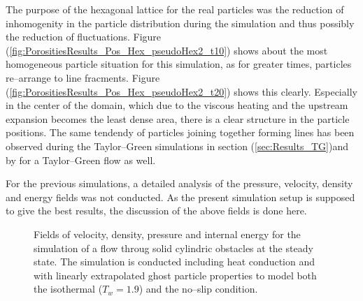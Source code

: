 \documentclass[11pt,a4paper,twoside]{report}
\begin{document}
The purpose of the hexagonal lattice for the real particles was the reduction of inhomogenity in the particle distribution during the simulation and thus possibly the reduction of fluctuations.  Figure (\ref{fig:PorositiesResults_Pos_Hex_pseudoHex2_t10}) shows about the most homogeneous particle situation for this simulation, as for greater times, particles re--arrange to line fracments. Figure (\ref{fig:PorositiesResults_Pos_Hex_pseudoHex2_t20}) shows this clearly. Especially in the center of the domain, which due to the viscous heating and the upstream expansion becomes the least dense area, there is a clear structure in the particle positions. The same tendendy of particles joining together forming lines has been observed during the Taylor--Green simulations in section (\ref{sec:Results_TG})and by \cite{Ellero2007} for a Taylor--Green flow as well. 

For the previous simulations, a detailed analysis of the pressure, velocity, density and energy fields was not conducted. As the present simulation setup is supposed to give the best results, the discussion of the above fields is done here.

\begin{figure}[h]

\centering
\label{fig:Cylinders_Hex_steadyState}

\caption[Property fields for Porosity]{Fields of velocity, density, pressure and internal energy for the simulation of a flow throug solid cylindric obstacles at the steady state. The simulation is conducted including heat conduction and with linearly extrapolated ghost particle properties to model both the isothermal ($T_w=1.9$) and the no--slip condition.}

\end{figure}
\end{document}
